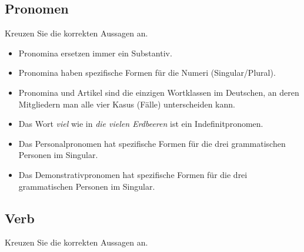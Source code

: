 \documentclass[12pt,a4paper,twoside]{article}
\newcommand{\gruen}[1]{\textcolor{gruen}{#1}}
\newcommand{\morphologieaufgabe}{}
\newcommand{\FUBreak}{\clearpage}
\newcommand{\FSUBreak}{}
\newcommand{\FUHalbzeile}{\hspace{0.5\baselineskip}}
\newcommand{\morphologieaufgabe}{\textbf{\gruen{Morphologie-Seminar}}\ |\ }
\newcommand{\FUBreak}{}
\newcommand{\FSUBreak}{\clearpage}
\newcommand{\FUHalbzeile}{}
\newcommand{\Lf}{
  \setlength{\itemsep}{1pt}
  \setlength{\parskip}{0pt}
  \setlength{\parsep}{0pt}
}
\begin{document}

\FUBreak
\FSUBreak

\subsection{\morphologieaufgabe Pronomen}

Kreuzen Sie die korrekten Aussagen an.

\begin{itemize}[label=\Square]\Lf
  \item Pronomina ersetzen immer ein Substantiv.
  \item Pronomina haben spezifische Formen für die Numeri (Singular\slash Plural).
  \item Pronomina und Artikel sind die einzigen Wortklassen im Deutschen, an deren Mitgliedern man alle vier Kasus (Fälle) unterscheiden kann.
  \item Das Wort \textit{viel} wie in \textit{die vielen Erdbeeren} ist ein Indefinitpronomen.
  \item Das Personalpronomen hat spezifische Formen für die drei grammatischen Personen im Singular.
  \item Das Demonstrativpronomen hat spezifische Formen für die drei grammatischen Personen im Singular.
\end{itemize}

\FUHalbzeile

\subsection{\morphologieaufgabe Verb}

Kreuzen Sie die korrekten Aussagen an.
\end{document}
